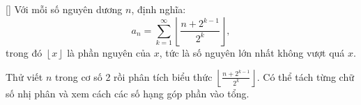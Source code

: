 \documentclass[../03-arithmetic-functions.tex]{subfiles}
\begin{document}
\begin{exercise*}\label{example:GBR-2015-TST2-Q2-P3}[\textbf{}]
    Với mỗi số nguyên dương \( n \), định nghĩa:
    \[
        a_n = \sum_{k=1}^{\infty} \left\lfloor \frac{n + 2^{k-1}}{2^k} \right\rfloor,
    \]
    trong đó \( \left\lfloor x \right\rfloor \) là phần nguyên của \( x \), tức là số nguyên lớn nhất không vượt quá \( x \).
\end{exercise*}

\begin{remark*}
    Thử viết \( n \) trong cơ số 2 rồi phân tích biểu thức \( \left\lfloor \tfrac{n + 2^{k-1}}{2^k} \right\rfloor \).  
    Có thể tách từng chữ số nhị phân và xem cách các số hạng góp phần vào tổng.
\end{remark*}
\end{document}
